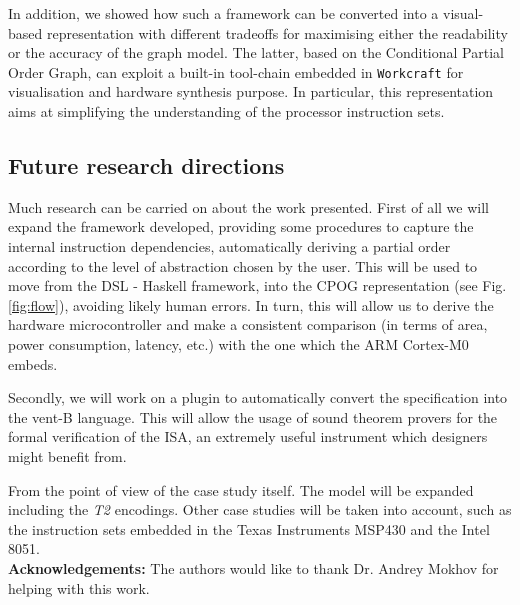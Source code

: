 \documentclass[conference]{IEEEtran}
\begin{document}
In addition, we showed how such a framework can be converted into a visual-based
representation with different tradeoffs for maximising either the readability or the accuracy
of the graph model. The latter, based on the Conditional Partial Order Graph, can exploit a
built-in tool-chain embedded in \verb|Workcraft| for visualisation and hardware synthesis
purpose. In particular, this representation aims at simplifying the understanding of the
processor instruction sets.

\subsection{Future research directions}
\label{sec:frd}
Much research can be carried on about the work presented. First of all we will expand the
framework developed, providing some procedures to capture the internal instruction
dependencies, automatically deriving a partial order according to the level of abstraction
chosen by the user. This will be used to move from the DSL - Haskell framework, into the CPOG
representation (see Fig. \ref{fig:flow}), avoiding likely human errors. In turn, this will
allow us to derive the hardware microcontroller and make a consistent comparison (in terms of
area, power consumption, latency, etc.) with the one which the ARM Cortex-M0 embeds.

Secondly, we will work on a plugin to automatically convert the specification into the
vent-B language. This will allow the usage of sound theorem provers for the formal
verification of the ISA, an extremely useful instrument which designers might benefit from.

From the point of view of the case study itself. The model will be expanded including the
\textit{T2} encodings. Other case studies will be taken into account, such as the instruction
sets embedded in the Texas Instruments MSP430 and the Intel 8051.\\

\noindent\textbf{Acknowledgements:} The authors would like to thank Dr. Andrey Mokhov for
helping with this work.

\end{document}
